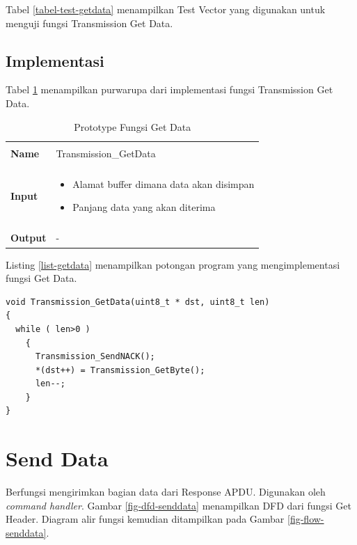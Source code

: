 Tabel \ref{tabel-test-getdata} menampilkan Test Vector yang digunakan untuk menguji fungsi Transmission Get Data.

\subsection {Implementasi}

Tabel \ref{tabel-getdata} menampilkan purwarupa dari implementasi fungsi Transmission Get Data.

\begin{table}[!h]
  \centering
  \begin{tabular}{p{2cm} p{8cm}}
    \hline\\
    {\bf Name} & Transmission\_GetData\\
    \hline\\
    {\bf Input} & 
    \begin{itemize}[noitemsep,topsep=0pt,parsep=0pt,partopsep=0pt]
    \item Alamat buffer dimana data akan disimpan
    \item Panjang data yang akan diterima
    \end{itemize}
    \\
    \hline\\
    {\bf Output} & -
    \\
    \hline
  \end{tabular}
  \caption{Prototype Fungsi Get Data}
  \label{tabel-getdata}
\end{table}

Listing \ref{list-getdata} menampilkan potongan program yang mengimplementasi fungsi Get Data.

\begin{lstlisting}[caption={Listing program fungsi Get Data}, label={list-getdata}]
void Transmission_GetData(uint8_t * dst, uint8_t len)
{
  while ( len>0 )
    {
      Transmission_SendNACK();
      *(dst++) = Transmission_GetByte();
      len--;
    }
}
\end{lstlisting}

\section{Send Data}
\label{sec_senddata}

Berfungsi mengirimkan bagian data dari Response APDU. Digunakan oleh \emph{command handler}. Gambar \ref{fig-dfd-senddata} menampilkan DFD dari fungsi Get Header. Diagram alir fungsi kemudian ditampilkan pada Gambar \ref{fig-flow-senddata}.


